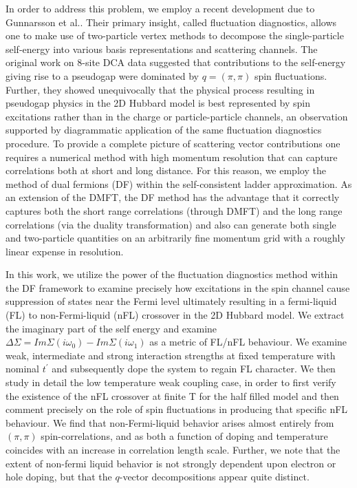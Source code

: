 \documentclass[twocolumn,notitlepage,prb,superscriptaddress,showpacs]{revtex4-1}
\begin{document}
In order to address this problem, we employ a recent development due to  Gunnarsson et al.\cite{gunnarsson:2015}. Their primary insight, called fluctuation diagnostics, allows one to make use of two-particle vertex methods to decompose the single-particle self-energy into various basis representations and scattering channels.   The original work on 8-site DCA data suggested that contributions to the self-energy giving rise to a pseudogap were dominated by $q=(\pi,\pi)$ spin fluctuations. Further, they showed unequivocally that the physical process resulting in pseudogap physics in the 2D Hubbard model is best represented by spin excitations rather than in the charge or particle-particle channels, an observation supported by diagrammatic application of the same fluctuation diagnostics procedure.\cite{wu:2017} 
To provide a complete picture of scattering vector contributions one requires a numerical method with high momentum resolution that can capture correlations both at short and long distance.  For this reason, we employ the method of dual fermions\cite{rubtsov:2008} (DF) within the self-consistent ladder approximation.\cite{opendf}   As an extension of the DMFT, the DF method has the advantage that it correctly captures both the short range correlations (through DMFT) and the long range correlations (via the duality transformation) and also can generate both single and two-particle quantities on an arbitrarily fine momentum grid with a roughly linear expense in resolution.  

In this work, we utilize the power of the fluctuation diagnostics method within the DF framework to examine precisely how excitations in the spin channel cause suppression of states near the Fermi level ultimately resulting in a fermi-liquid (FL) to non-Fermi-liquid (nFL) crossover in the 2D Hubbard model.  We extract the imaginary part of the self energy and examine $\Delta \Sigma = Im\Sigma (i\omega_0) - Im\Sigma (i\omega_1)$ as a metric of FL/nFL behaviour.\cite{park:2008, simkovic:2019}  We examine weak, intermediate and strong interaction strengths at fixed temperature with nominal $t^\prime$ and subsequently dope the system to regain FL character. \cite{wu:2017,schafer:2015}  We then study in detail the low temperature weak coupling case, in order to first verify the existence of the nFL crossover at finite T for the half filled model\cite{simkovic:2019} and then comment precisely on the role of spin fluctuations in producing that specific nFL behaviour. We find that non-Fermi-liquid behavior arises almost entirely from $(\pi,\pi)$ spin-correlations, and as both a function of doping and temperature coincides with an increase in correlation length scale.  Further, we note that the extent of non-fermi liquid behavior is not strongly dependent upon electron or hole doping, but that the $q$-vector decompositions appear quite distinct.
\end{document}
